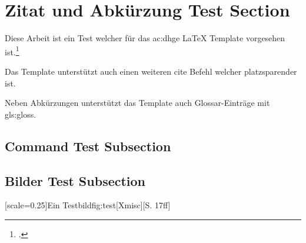 \section{Zitat und Abkürzung Test Section}

Diese Arbeit ist ein Test welcher f\"ur das \gls{ac:dhge} LaTeX Template vorgesehen ist.\footcite{Xmisc}

Das Template unterstützt auch einen weiteren cite Befehl welcher platzsparender ist.\supercite{Xmisc}

Neben Abkürzungen unterstützt das Template auch Glossar-Einträge mit \gls{gls:gloss}.

\cleardoublepage

\subsection{Command Test Subsection}

\doubleunderline{$150\mathrm{\Omega}$}

\subsection{Bilder Test Subsection}

[scale=0.25]{Ein Testbild}{fig:test}[Xmisc][S. 17ff]
